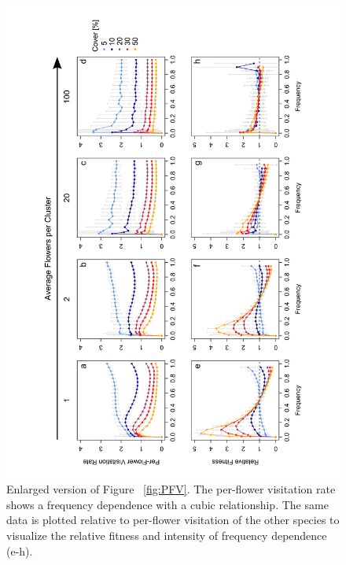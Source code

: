 \begin{figure} [!h]
	\centering
	\includegraphics[width=15cm]{Images/PFVgross}
	\caption{Enlarged version of Figure ~\ref{fig:PFV}. The per-flower visitation rate shows a frequency dependence with a cubic relationship. The same data is plotted relative to per-flower visitation of the other species to visualize the relative fitness and intensity of frequency dependence (e-h).}
	\label{fig:PFVgross}
\end{figure}

